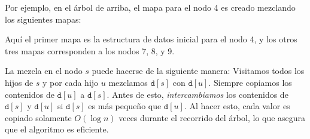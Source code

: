 Por ejemplo, en el árbol de arriba, el mapa para el nodo 4 es creado
mezclando los siguientes mapas:

\begin{center}
\end{center}

Aquí el primer mapa es la estructura de datos inicial para el nodo 4,
y los otros tres mapas corresponden a los nodos 7, 8, y 9.

La mezcla en el nodo $s$ puede hacerse de la siguiente manera:
Visitamos todos los hijos de $s$ y por cada hijo $u$ mezclamos
$\texttt{d}[s]$ con $\texttt{d}[u]$. Siempre copiamos los contenidos
de $\texttt{d}[u]$ a $\texttt{d}[s]$. Antes de esto, \emph{intercambiamos}
los contenidos de $\texttt{d}[s]$ y $\texttt{d}[u]$ si $\texttt{d}[s]$
es más pequeño que $\texttt{d}[u]$. Al hacer esto, cada valor es copiado
solamente $O(\log n)$ veces durante el recorrido del árbol, lo que
asegura que el algoritmo es eficiente.

